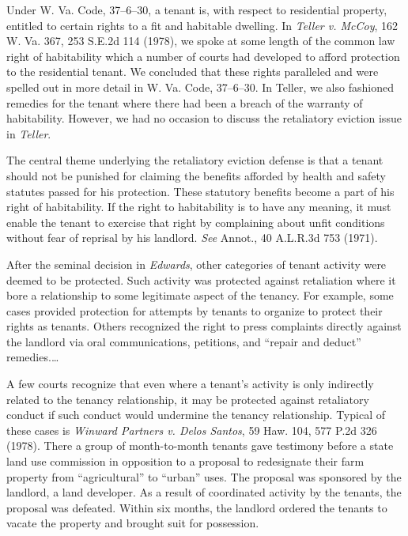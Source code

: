 Under W. Va. Code, 37--6--30, a tenant is, with respect to residential property,
entitled to certain rights to a fit and habitable dwelling. In \textit{Teller
v. McCoy}, 162 W. Va. 367, 253 S.E.2d 114 (1978), we spoke at some length of the
common law right of habitability which a number of courts had developed to
afford protection to the residential tenant. We concluded that these rights
paralleled and were spelled out in more detail in W. Va. Code, 37--6--30. In
Teller, we also fashioned remedies for the tenant where there had been a breach
of the warranty of habitability. However, we had no occasion to discuss the
retaliatory eviction issue in \textit{Teller}.

The central theme underlying the retaliatory eviction defense is that a tenant
should not be punished for claiming the benefits afforded by health and safety
statutes passed for his protection. These statutory benefits become a part of
his right of habitability. If the right to habitability is to have any meaning,
it must enable the tenant to exercise that right by complaining about unfit
conditions without fear of reprisal by his landlord. \textit{See} Annot., 40
A.L.R.3d 753 (1971).

After the seminal decision in \textit{Edwards}, other categories of tenant
activity were deemed to be protected. Such activity was protected against
retaliation where it bore a relationship to some legitimate aspect of the
tenancy. For example, some cases provided protection for attempts by tenants to
organize to protect their rights as tenants. Others recognized the right to
press complaints directly against the landlord via oral communications,
petitions, and ``repair and deduct'' remedies.\ldots

A few courts recognize that even where a tenant's activity is only indirectly
related to the tenancy relationship, it may be protected against retaliatory
conduct if such conduct would undermine the tenancy relationship. Typical of
these cases is \textit{Winward Partners v. Delos Santos}, 59 Haw. 104, 577 P.2d
326 (1978). There a group of month-to-month tenants gave testimony before a
state land use commission in opposition to a proposal to redesignate their farm
property from ``agricultural'' to ``urban'' uses. The proposal was sponsored by
the landlord, a land developer. As a result of coordinated activity by the
tenants, the proposal was defeated. Within six months, the landlord ordered the
tenants to vacate the property and brought suit for possession.

